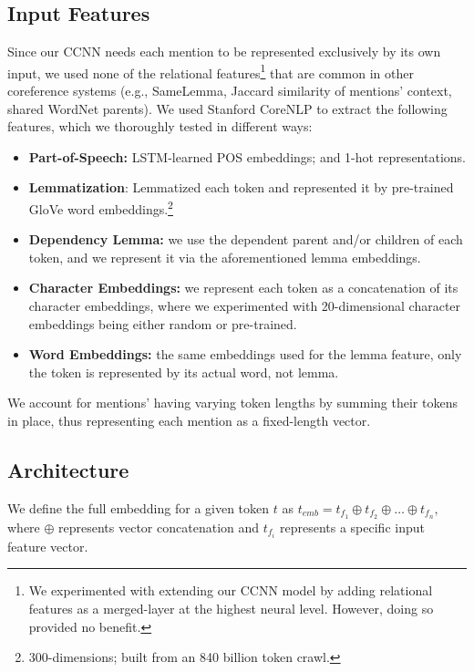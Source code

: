 \documentclass[11pt,a4paper]{article}
\begin{document}
\subsection{Input Features}
\label{sec:features}
Since our CCNN needs each mention to be represented exclusively by its own input, we used none of the relational features\footnote{We experimented with extending our CCNN model by adding relational features as a merged-layer at the highest neural level.  However, doing so provided no benefit.} that are common in other coreference systems (e.g., SameLemma, Jaccard similarity of mentions' context, shared WordNet parents).  We used Stanford CoreNLP \cite{manning-EtAl:2014:P14-5} to extract the following features, which we thoroughly tested in different ways: %
\begin{itemize}
  \item \textbf{Part-of-Speech:} LSTM-learned POS embeddings; and 1-hot representations.
  \item \textbf{Lemmatization}: Lemmatized each token and represented it by pre-trained GloVe \cite{pennington2014glove} word embeddings.\footnote{300-dimensions; built from an 840 billion token crawl.}
  \item \textbf{Dependency Lemma:} we use the dependent parent and/or children of each token, and we represent it via the aforementioned lemma embeddings.
  \item \textbf{Character Embeddings:} we represent each token as a concatenation of its character embeddings, where we experimented with 20-dimensional character embeddings being either random or pre-trained. %
  \item \textbf{Word Embeddings:} the same embeddings used for the lemma feature, only the token is represented by its actual word, not lemma.
\end{itemize}
We account for mentions' having varying token lengths by summing their tokens in place, thus representing each mention as a fixed-length vector.

\subsection{Architecture}
We define the full embedding for a given token $t$ as $t_{emb} = t_{f_{1}} \oplus t_{f_{2}} \oplus \ldots \oplus t_{f_{n}},$ where $\oplus$ represents vector concatenation and $t_{f_{i}}$ represents a specific input feature vector.
\end{document}
